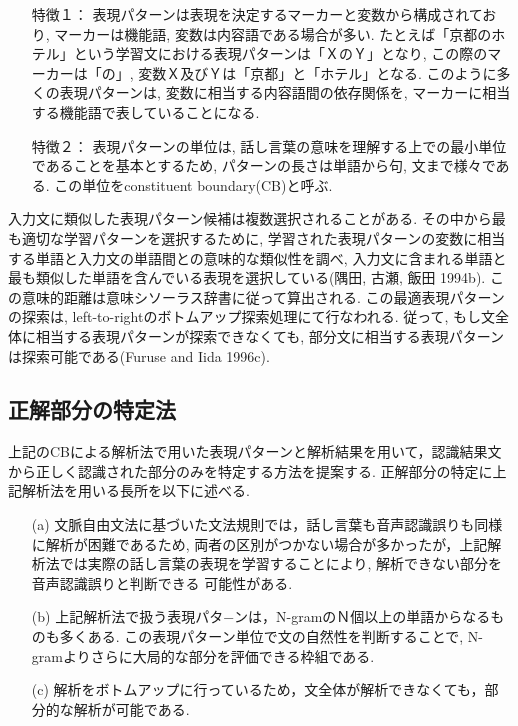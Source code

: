 \begin{itemize}
\item[特徴１：] 表現パターンは表現を決定するマーカーと変数から構成されており, マーカーは機能語, 変数は内容語である場合が多い. 
たとえば「京都のホテル」という学習文における表現パターンは「ＸのＹ」となり, この際のマーカーは「の」, 変数Ｘ及びＹは「京都」と「ホテル」となる. 
このように多くの表現パターンは, 変数に相当する内容語間の依存関係を, マーカーに相当する機能語で表していることになる. 
\item[特徴２：] 表現パターンの単位は, 話し言葉の意味を理解する上での最小単位であることを基本とするため, パターンの長さは単語から句, 文まで様々である. この単位をconstituent boundary(CB)と呼ぶ. 
\end{itemize}

\vspace{0.5cm}

入力文に類似した表現パターン候補は複数選択されることがある. 
その中から最も適切な学習パターンを選択するために, 学習された表現パターンの変数に相当する単語と入力文の単語間との意味的な類似性を調べ, 入力文に含まれる単語と最も類似した単語を含んでいる表現を選択している(隅田, 古瀬, 飯田 1994b). 
この意味的距離は意味シソーラス辞書に従って算出される. 
この最適表現パターンの探索は, left-to-rightのボトムアップ探索処理にて行なわれる. 従って, もし文全体に相当する表現パターンが探索できなくても, 部分文に相当する表現パターンは探索可能である(Furuse and Iida 1996c). 


\subsection{正解部分の特定法}

上記のCBによる解析法で用いた表現パターンと解析結果を用いて，認識結果文から正しく認識された部分のみを特定する方法を提案する. 
正解部分の特定に上記解析法を用いる長所を以下に述べる. 

\vspace{0.5cm}
\begin{itemize}
\item[(a)] 文脈自由文法に基づいた文法規則では，話し言葉も音声認識誤りも同様に解析が困難であるため, 両者の区別がつかない場合が多かったが，上記解析法では実際の話し言葉の表現を学習することにより, 解析できない部分を音声認識誤りと判断できる
可能性がある. 
\item[(b)] 上記解析法で扱う表現パタ−ンは，N-gramのＮ個以上の単語からなるものも多くある. この表現パターン単位で文の自然性を判断することで, N-gramよりさらに大局的な部分を評価できる枠組である. 
\item[(c)] 解析をボトムアップに行っているため，文全体が解析できなくても，部分的な解析が可能である. 
\end{itemize}
\vspace{0.5cm}

